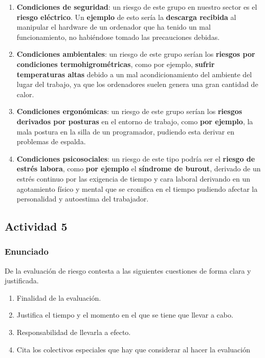 \begin{enumerate}[label=\alph*)]
    \item \textbf{Condiciones de seguridad}: un riesgo de este grupo en nuestro sector es el \textbf{riesgo eléctrico}. Un \textbf{ejemplo} de esto sería la \textbf{descarga recibida} al manipular el hardware de un ordenador que ha tenido un mal funcionamiento, no habiéndose tomado las precauciones debidas.
    \item \textbf{Condiciones ambientales}: un riesgo de este grupo serían los \textbf{riesgos por condiciones termohigrométricas}, como por ejemplo, \textbf{sufrir temperaturas altas} debido a un mal acondicionamiento del ambiente del lugar del trabajo, ya que los ordenadores suelen genera una gran cantidad de calor.
    \item \textbf{Condiciones ergonómicas}: un riesgo de este grupo serían los \textbf{riesgos derivados por posturas} en el entorno de trabajo, como \textbf{por ejemplo}, la mala postura en la silla de un programador, pudiendo esta derivar en problemas de espalda.
    \item \textbf{Condiciones psicosociales}: un riesgo de este tipo podría ser el \textbf{riesgo de estrés labora}, como \textbf{por ejemplo} el \textbf{síndrome de burout}, derivado de un estrés continuo por las exigencia de tiempo y cara laboral derivando en un agotamiento físico y mental que se cronifica en el tiempo pudiendo afectar la personalidad y autoestima del trabajador.
\end{enumerate}

\subsection{Actividad 5}

\subsubsection{Enunciado}
De la evaluación de riesgo contesta a las siguientes cuestiones de forma clara y justificada.

\begin{enumerate}[label=\alph*)]
    \item Finalidad de la evaluación.
    \item Justifica el tiempo y el momento en el que se tiene que llevar a cabo.
    \item Responsabilidad de llevarla a efecto.
    \item Cita los colectivos especiales que hay que considerar al hacer la evaluación
\end{enumerate}


